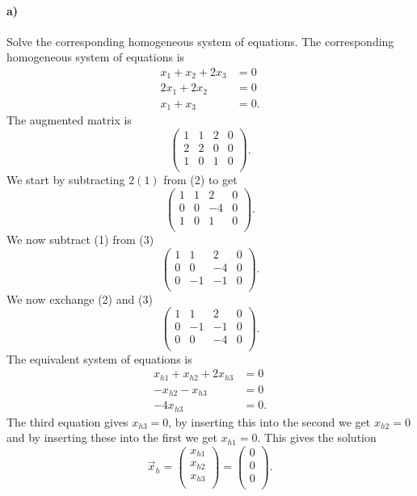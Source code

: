 \paragraph{a)} Solve the corresponding homogeneous system of equations.
\bigbreak
The corresponding homogeneous system of equations is
\begin{align*}
  x_1 + x_2 + 2x_3 &= 0 \\
  2x_1 + 2x_2 &= 0 \\
  x_1 + x_3 &= 0
.\end{align*}
The augmented matrix is
\[ 
\left( \begin{array}{ccc|c}
1 & 1 & 2 & 0\\
2 & 2 & 0 & 0\\
1 & 0 & 1 & 0\\
\end{array} \right)
.\]
We start by subtracting $2(1)$ from (2) to get
\[ 
\left( \begin{array}{ccc|c}
1 & 1 & 2 & 0\\
0 & 0 & -4 & 0\\
1 & 0 & 1 & 0\\
\end{array} \right)
.\]
We now subtract (1) from (3)
\[ 
\left( \begin{array}{ccc|c}
1 & 1 & 2 & 0\\
0 & 0 & -4 & 0\\
0 & -1 & -1 & 0\\
\end{array} \right)
.\]
We now exchange (2) and (3)
\[ 
\left( \begin{array}{ccc|c}
1 & 1 & 2 & 0\\
0 & -1 & -1 & 0\\
0 & 0 & -4 & 0\\
\end{array} \right)
.\]
The equivalent system of equations is
\begin{align*}
  x_{h1} + x_{h2} + 2x_{h3} &= 0 \\
  -x_{h2} - x_{h3} &= 0 \\
  -4x_{h3} &= 0
.\end{align*}
The third equation gives $x_{h3} = 0$, by inserting this into the second we get $x_{h2} = 0$ and by inserting these into the first we get $x_{h1} = 0$. This gives the solution
\[ 
\Vec{x}_h = \begin{pmatrix}
x_{h1}\\
x_{h2}\\
x_{h3}\\
\end{pmatrix} = \begin{pmatrix}
0\\
0\\
0\\
\end{pmatrix}
.\]



